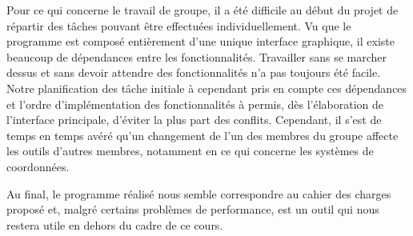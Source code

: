 Pour ce qui concerne le travail de groupe, il a été difficile au début du projet de répartir des tâches pouvant être effectuées individuellement. Vu que le programme est composé entièrement d'une unique interface graphique, il existe beaucoup de dépendances entre les fonctionnalités. Travailler sans se marcher dessus et sans devoir attendre des fonctionnalités n'a pas toujours été facile. Notre planification des tâche initiale à cependant pris en compte ces dépendances et l'ordre d'implémentation des fonctionnalités à permis, dès l'élaboration de l'interface principale, d'éviter la plus part des conflits. Cependant, il s'est de temps en temps avéré qu'un changement de l'un des membres du groupe affecte les outils d'autres membres, notamment en ce qui concerne les systèmes de coordonnées.

Au final, le programme réalisé nous semble correspondre au cahier des charges proposé et, malgré certains problèmes de performance, est un outil qui nous restera utile en dehors du cadre de ce cours.
